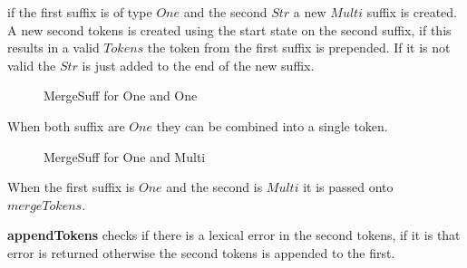 if the first suffix is of type $One$ and the second $Str$ a new $Multi$ suffix
is created. A new second tokens is created using the start state on the second
suffix, if this results in a valid $Tokens$ the token from the first suffix is
prepended. If it is not valid the $Str$ is just added to the end of the new
suffix.

\begin{figure}[h!]
  
  \caption{MergeSuff for One and One \label{fig:msoneone}}
\end{figure}

When both suffix are $One$ they can be combined into a single token.

\begin{figure}[h!]
  
  \caption{MergeSuff for One and Multi \label{fig:msonemulti}}
\end{figure}

When the first suffix is $One$ and the second is $Multi$ it is passed onto
$mergeTokens$.

\textbf{appendTokens} checks if there is a lexical error in the second tokens,
if it is that error is returned otherwise the second tokens is appended to the
first.

